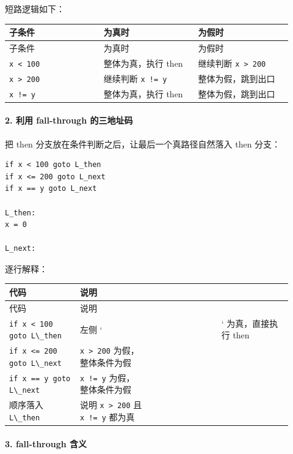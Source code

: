 \documentclass[UTF8]{ctexart}
\begin{document}
短路逻辑如下：

\begin{longtable}{|p{0.31\linewidth}|p{0.31\linewidth}|p{0.31\linewidth}|}
\hline
子条件 & 为真时 & 为假时 \\
\hline
\endfirsthead
子条件 & 为真时 & 为假时 \\
\hline
\endhead
\texttt{x < 100} & 整体为真，执行 then & 继续判断 \texttt{x > 200} \\
\hline
\texttt{x > 200} & 继续判断 \texttt{x != y} & 整体为假，跳到出口 \\
\hline
\texttt{x != y} & 整体为真，执行 then & 整体为假，跳到出口 \\
\hline
\end{longtable}

\paragraph*{2. 利用 fall-through 的三地址码}

把 then 分支放在条件判断之后，让最后一个真路径自然落入 then 分支：

\begin{Verbatim}[fontsize=\small,breaklines=true]
if x < 100 goto L_then
if x <= 200 goto L_next
if x == y goto L_next

L_then:
x = 0

L_next:
\end{Verbatim}

逐行解释：

\begin{longtable}{|p{0.23\linewidth}|p{0.23\linewidth}|p{0.23\linewidth}|p{0.23\linewidth}|}
\hline
代码 & 说明 &  &  \\
\hline
\endfirsthead
代码 & 说明 &  &  \\
\hline
\endhead
\texttt{if x < 100 goto L\textbackslash{}\_then} & 左侧 ` &  & ` 为真，直接执行 then \\
\hline
\texttt{if x <= 200 goto L\textbackslash{}\_next} & \texttt{x > 200} 为假，整体条件为假 &  &  \\
\hline
\texttt{if x == y goto L\textbackslash{}\_next} & \texttt{x != y} 为假，整体条件为假 &  &  \\
\hline
顺序落入 \texttt{L\textbackslash{}\_then} & 说明 \texttt{x > 200} 且 \texttt{x != y} 都为真 &  &  \\
\hline
\end{longtable}

\paragraph*{3. fall-through 含义}
\end{document}
